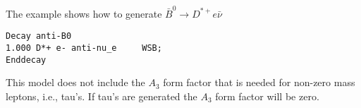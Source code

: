 \Example
The example shows how to generate $\bar B^0\rightarrow D^{*+}e\bar\nu$
\begin{verbatim}
Decay anti-B0
1.000 D*+ e- anti-nu_e     WSB;
Enddecay
\end{verbatim}

\Notes
This model does not include the $A_3$ form factor that is 
needed for non-zero mass leptons, i.e., tau's. If tau's
are generated the $A_3$ form factor will be zero.

































